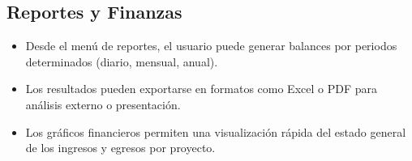 \subsection{Reportes y Finanzas}
\begin{itemize}
    \item Desde el menú de reportes, el usuario puede generar balances por periodos determinados (diario, mensual, anual).
    \item Los resultados pueden exportarse en formatos como Excel o PDF para análisis externo o presentación.
    \item Los gráficos financieros permiten una visualización rápida del estado general de los ingresos y egresos por proyecto.
\end{itemize}
